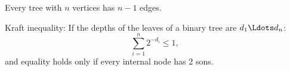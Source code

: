 Every tree with $n$ vertices has $n-1$ edges.
\par\vskip 3pt
Kraft inequality:
If the depths of the leaves of a binary tree are $d_1 \Ldots d_n$:
$$
\sum_{i=1}^n 2^{- d_i} \leq 1,
$$
and equality holds only if every internal node has 2 sons.
